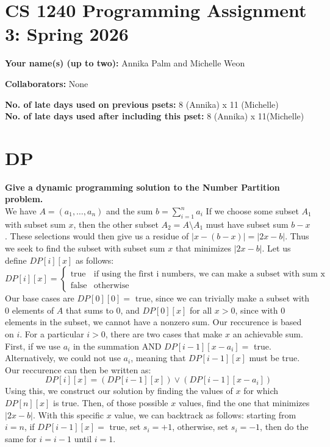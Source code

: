 \documentclass[11pt]{article}
\begin{document}
	
	\section*{CS 1240 Programming Assignment 3: Spring 2026}
 		
	\textbf{Your name(s) (up to two):} Annika Palm and Michelle Weon 
		
	\textbf{Collaborators:} None

	\textbf{No. of late days used on previous psets: } 8 (Annika) x 11 (Michelle) \\ \indent
	\textbf{No. of late days used after including this pset: } 8 (Annika) x 11(Michelle)

\section{DP}
{\bf Give a dynamic programming solution to the Number Partition
problem.} \\
We have $A = (a_1, \dots, a_n)$ and the sum $b = \sum_{i=1}^{n} a_i$
If we choose some subset $A_1$ with subset sum $x$, then the other subset $A_2 = A \setminus A_1$
must have subset sum $b-x$. These selections would then give us a residue of $|x - (b-x)| = |2x-b|$. Thus we 
seek to find the subset with subset sum $x$ that minimizes $|2x-b|$.
Let us define $DP[i][x]$ as follows: 
\[
DP[i][x]= 
\begin{cases} 
  \text{true} & \text{if using the first i numbers, we can make a subset with sum x} \\
  \text{false}   & \text{otherwise } 
\end{cases}
\]
Our base cases are $DP[0][0] =$ true, since we can trivially make a subset with 0 elements of $A$ that sums to 0, and
$DP[0][x]$ for all $x > 0$, since with 0 elements in the subset, we cannot have a nonzero sum. 
Our reccurence is based on $i$. For a particular $i > 0$, there are two cases that make $x$ an achievable sum. First, if we use $a_i$ 
in the summation AND $DP[i-1][x-a_i] = $ true. Alternatively, we could not use $a_i$, meaning that $DP[i-1][x]$ must be true.
Our reccurence can then be written as:
\[
DP[i][x] = (DP[i-1][x]) \vee (DP[i-1][x-a_i]) 
\]
Using this, we construct our solution by finding the values of $x$ for which $DP[n][x]$ is true. Then, of those possible $x$ values, find the 
one that minimizes $|2x-b|$. With this specific $x$ value, we can backtrack as follows:
starting from $i = n$, if $DP[i-1][x] = $ true, set $s_i = +1$, otherwise, set $s_i = -1$, then do the same for $i = i-1$ until $i=1$. 
\smallskip 
\end{document}

